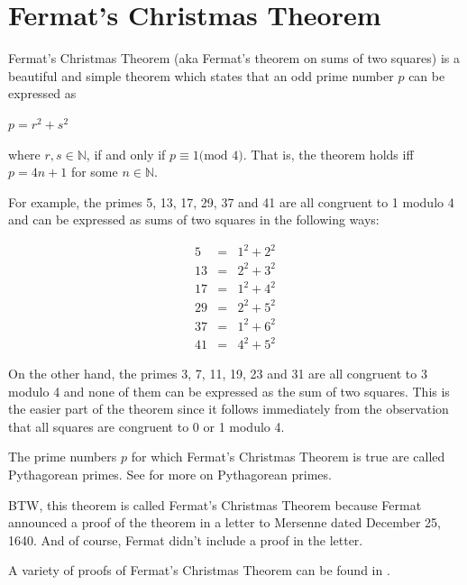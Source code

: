 \documentclass{article}
\theoremstyle{definition}
\begin{document}
\section{Fermat's Christmas Theorem}
%
%
%
\noindent
Fermat's Christmas Theorem (aka Fermat's theorem on sums of two
squares) \cite{wiki:christmas_theorem} is a beautiful and simple
theorem which states that an odd prime number $p$ can be
expressed as

\bigskip
\begin{center}
\scalebox{1.25} {$p = r^{2} + s^{2}$}
\end{center}
\bigskip

\noindent
where $r,s \in \mathbb{N}$, if and only if $p \equiv 1 \textrm{
(mod $4$)}$. That is, the theorem holds iff $p = 4n + 1$ for some
$n \in \mathbb{N}$.

\bigskip
\noindent
For example, the primes 5, 13, 17, 29, 37 and 41 are all
congruent to 1 modulo 4 and can be expressed as sums of two
squares in the following ways:

\begin{equation*}
\begin{array}{rcll} 
5   &=& 1^{2} + 2^{2}   \\
13  &=& 2^{2} + 3^{2}   \\
17  &=& 1^{2} + 4^{2}   \\
29  &=& 2^{2} + 5^{2}   \\
37  &=& 1^{2} + 6^{2}   \\
41  &=& 4^{2} + 5^{2}
\end{array}
\end{equation*}


\bigskip
\noindent
On the other hand, the primes 3, 7, 11, 19, 23 and 31 are all
congruent to 3 modulo 4 and none of them can be expressed as the
sum of two squares. This is the easier part of the theorem since
it follows immediately from the observation that all squares are
congruent to 0 or 1 modulo 4.


\bigskip
\noindent
The prime numbers $p$ for which Fermat's Christmas Theorem is
true are called Pythagorean primes.  See
\cite{wiki:pythagorean_primes} for more on Pythagorean primes.

\bigskip
\noindent
BTW, this theorem is called Fermat's Christmas Theorem because
Fermat announced a proof of the theorem in a letter to Mersenne
dated December 25, 1640. And of course, Fermat didn't include a
proof in the letter.


\bigskip
\noindent
A variety of proofs of Fermat's Christmas Theorem can be found in
\cite{wiki:christmas_theorem_proofs}.
%
%
%
\end{document}

